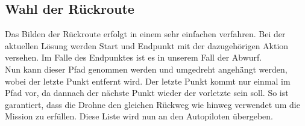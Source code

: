\subsection{Wahl der Rückroute}
Das Bilden der Rückroute erfolgt in einem sehr einfachen verfahren. Bei der aktuellen Lösung werden Start und Endpunkt mit der dazugehörigen Aktion versehen. Im Falle des Endpunktes ist es in unserem Fall der Abwurf.
\\
Nun kann dieser Pfad genommen werden und umgedreht angehängt werden, wobei der letzte Punkt entfernt wird. Der letzte Punkt kommt nur einmal im Pfad vor, da dannach der nächste Punkt wieder der vorletzte sein soll. So ist garantiert, dass die Drohne den gleichen Rückweg wie hinweg verwendet um die Mission zu erfüllen. Diese Liste wird nun an den Autopiloten übergeben.
